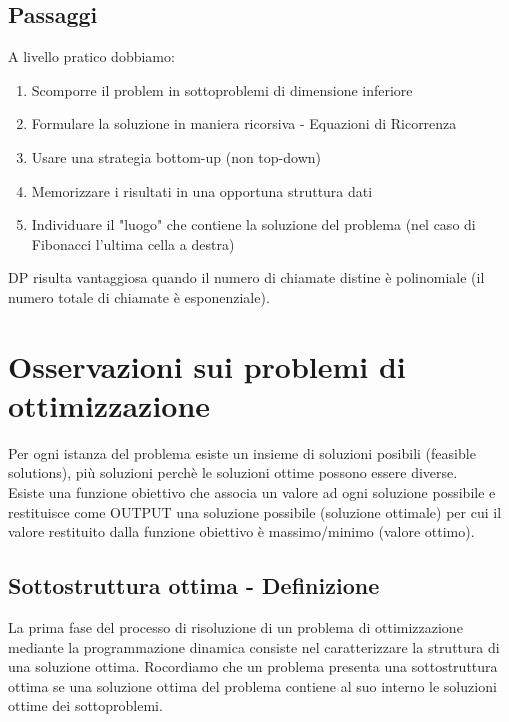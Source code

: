\subsection{Passaggi}
A livello pratico dobbiamo:
\begin{enumerate}
    \item Scomporre il problem in sottoproblemi di dimensione inferiore
    \item Formulare la soluzione in maniera ricorsiva - Equazioni di Ricorrenza
    \item Usare una strategia bottom-up (non top-down)
    \item Memorizzare i risultati in una opportuna struttura dati
    \item Individuare il "luogo" che contiene la soluzione del problema (nel caso di Fibonacci l'ultima cella a destra)
\end{enumerate}
DP risulta vantaggiosa quando il numero di chiamate distine è polinomiale (il numero
totale di chiamate è esponenziale).
\section{Osservazioni sui problemi di ottimizzazione}
Per ogni istanza del problema esiste un insieme di soluzioni posibili (feasible solutions),
più soluzioni perchè le soluzioni ottime possono essere diverse.\\
Esiste una funzione obiettivo che associa un valore ad ogni soluzione possibile e
restituisce come OUTPUT una soluzione possibile (soluzione ottimale) per cui il valore restituito dalla funzione
obiettivo è massimo/minimo (valore ottimo).
\subsection{Sottostruttura ottima - Definizione}
La prima fase del processo di risoluzione di un problema di ottimizzazione mediante la programmazione dinamica
consiste nel caratterizzare la struttura di una soluzione ottima. Rocordiamo che un problema
presenta una sottostruttura ottima se una soluzione ottima del problema contiene al suo interno le
soluzioni ottime dei sottoproblemi.
